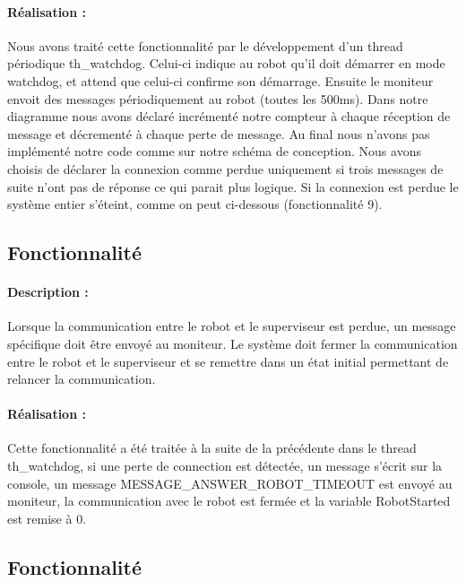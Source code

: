 \documentclass[11pt, a4paper]{paper}
\newcounter{cptreq}
\begin{document}
{{\paragraph{\color{black}Réalisation :}  {\color{black} Nous avons traité cette fonctionnalité par le développement d'un thread périodique th\_watchdog. Celui-ci indique au robot qu'il doit démarrer en mode watchdog, et attend que celui-ci confirme son démarrage. Ensuite le moniteur envoit des messages périodiquement au robot (toutes les 500ms). Dans notre diagramme nous avons déclaré incrémenté notre compteur à chaque réception de message et décrementé à chaque perte de message. Au final nous n'avons pas implémenté notre code comme sur notre schéma de conception. Nous avons choisis de déclarer la connexion comme perdue uniquement si trois messages de suite n'ont pas de réponse ce qui parait plus logique. Si la connexion est perdue le système entier s'éteint, comme on peut ci-dessous (fonctionnalité 9). }

\subsection{Fonctionnalité \thecptreq }

\paragraph{Description :} Lorsque la communication entre le robot et le superviseur est perdue, un message spécifique doit être envoyé au moniteur. Le système doit fermer la communication entre le robot et le superviseur et se remettre dans un état initial permettant de relancer la communication.

\paragraph{\color{black}Réalisation :}  {\color{black} Cette fonctionnalité a été traitée à la suite de la précédente dans le thread th\_watchdog, si une perte de connection est détectée, un message s'écrit sur la console, un message MESSAGE\_ANSWER\_ROBOT\_TIMEOUT est envoyé au moniteur, la communication avec le robot est fermée et la variable RobotStarted est remise à 0.}

{\color{black}
\subsection{Fonctionnalité \thecptreq *}

}}}
\end{document}
